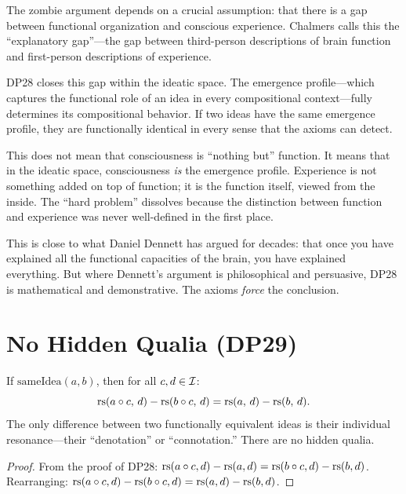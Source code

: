 \begin{interpretation}
\label{interp:dissolving-hard-problem}
The zombie argument depends on a crucial assumption: that there is a
gap between functional organization and conscious experience.  Chalmers
calls this the ``explanatory gap''---the gap between third-person
descriptions of brain function and first-person descriptions of
experience.

DP28 closes this gap within the ideatic space.  The emergence
profile---which captures the functional role of an idea in every
compositional context---fully determines its compositional behavior.
If two ideas have the same emergence profile, they are functionally
identical in every sense that the axioms can detect.

This does not mean that consciousness is ``nothing but'' function.
It means that in the ideatic space, consciousness \emph{is} the
emergence profile.  Experience is not something added on top of
function; it is the function itself, viewed from the inside.
The ``hard problem'' dissolves because the distinction between
function and experience was never well-defined in the first place.

This is close to what Daniel Dennett has argued for decades: that
once you have explained all the functional capacities of the brain,
you have explained everything.  But where Dennett's argument is
philosophical and persuasive, DP28 is mathematical and demonstrative.
The axioms \emph{force} the conclusion.
\end{interpretation}

\section{No Hidden Qualia (DP29)}

\begin{theorem}
\label{thm:no-hidden-qualia}
If $\mathrm{sameIdea}(a, b)$, then for all $c, d \in \mathcal{I}$:
\[
\mathrm{rs}(a \circ c,\, d) - \mathrm{rs}(b \circ c,\, d) = \mathrm{rs}(a,\, d) - \mathrm{rs}(b,\, d).
\]
The only difference between two functionally equivalent ideas is their
individual resonance---their ``denotation'' or ``connotation.''  There
are no hidden qualia.
\end{theorem}

\begin{proof}
From the proof of DP28:
$\mathrm{rs}(a \circ c, d) - \mathrm{rs}(a, d) = \mathrm{rs}(b \circ c, d) - \mathrm{rs}(b, d)$.
Rearranging:
$\mathrm{rs}(a \circ c, d) - \mathrm{rs}(b \circ c, d) = \mathrm{rs}(a, d) - \mathrm{rs}(b, d)$.
\end{proof}

